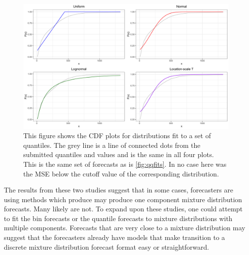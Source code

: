 \documentclass[11pt,notitlepage]{isuthesis}
\begin{document}
\begin{figure}[htbp]
\centerline{\includegraphics[scale=.15]{Images/cdf_gleam_110121_1wkincdeath_st16.png}}
\begin{center}
\begin{minipage}{10cm}
\captionsetup{font=scriptsize}
\caption[CDF plot for quantile fit]{This figure shows the CDF plots for 
distributions fit to a set of quantiles. The grey line is a line of connected 
dots from the submitted quantiles and values and is the same in all four plots.
This is the same set of forecasts as is \ref{fig:qqfits}.
In no case here was the MSE below the cutoff value of the 
corresponding distribution.}
\label{fig:cdffits}
\end{minipage}
\end{center}
\end{figure}



The results from these two studies suggest that in some cases, forecasters
are using methods which produce may produce one component mixture distribution
forecasts. Many
likely are not. To expand upon these studies, one could attempt to fit the 
bin forecasts or the quantile forecasts to mixture 
distributions with multiple components. Forecasts that are very close to 
a mixture distribution may suggest that the forecasters already have models that
make transition to a discrete mixture distribution forecast format easy or
straightforward.
\end{document}
